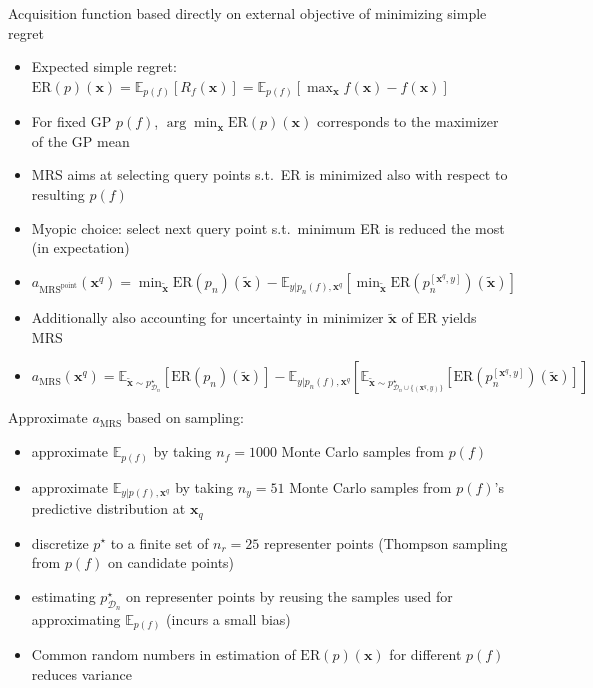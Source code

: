 \begin{block}{}

Acquisition function based directly on external objective of minimizing simple regret
\begin{itemize}
 \item Expected simple regret: $\text{ER}(p)(\mathbf{x}) = \mathbb{E}_{p(f)}[R_f(\mathbf{x})]
= \mathbb{E}_{p(f)}[\max_{\mathbf{x}} f(\mathbf{x}) - f(\mathbf{
x})]$
 \item For fixed GP $p(f)$, $\arg\min_\mathbf{x} \text{ER}(p)(\mathbf{x})$ corresponds to the maximizer of the GP mean
 \item MRS aims at selecting query points s.t.\  ER is minimized also with respect to resulting $p(f)$
 \item Myopic choice: select next query point s.t.\ minimum ER is reduced the most (in expectation)
 \item $a_{\text{MRS}^{\text{point}}}(\mathbf{x}^q)
	= \min_{\mathbf{\tilde x}}\text{ER}(p_n)(\mathbf{\tilde x})
	 - \mathbb{E}_{y \vert p_n(f), \mathbf{x}^q}[\min_{\mathbf{\tilde x}}  \text{ER}(p^{[\mathbf{x}^q, y]}_n)(\mathbf{\tilde x})]$
 \item Additionally also accounting for uncertainty in minimizer $\mathbf{\tilde x}$ of $\text{ER}$ yields MRS
 \item $a_{\text{MRS}}(\mathbf{x}^q)
    = \mathbb{E}_{\mathbf{\tilde x} \sim p^\star_{\mathcal{D}_n}}[\text{ER}(p_n)(\mathbf{\tilde x})] 
	   - \mathbb{E}_{y \vert p_n(f), \mathbf{x}^q}[
		  \mathbb{E}_{\mathbf{\tilde x} \sim p^\star_{\mathcal{D}_n \cup \{(\mathbf{x}^q, y)\}}}[
			 \text{ER}(p^{[\mathbf{x}^q, y]}_n)(\mathbf{\tilde x})]]$
\end{itemize}

Approximate $a_{\text{MRS}}$ based on sampling:
\begin{itemize}
 \item approximate $\mathbb{E}_{p(f)}$ by taking $n_f=1000$ Monte Carlo samples from $p(f)$
 \item approximate $\mathbb{E}_{y \vert p(f), \mathbf{x}^q}$  by taking
$n_y=51$ Monte Carlo samples from $p(f)$'s predictive distribution at
$\mathbf{x}_q$
 \item discretize $p^\star$ to a finite set of $n_r=25$ representer points (Thompson
sampling from $p(f)$ on candidate points)
 \item estimating $p^\star_{\mathcal{D}_n}$ on representer points by reusing the samples used 
for approximating $\mathbb{E}_{p(f)}$ (incurs a small bias)
\item Common random numbers in estimation of
$\text{ER}(p)(\mathbf{x})$ for different $p(f)$ reduces variance
\end{itemize}
\end{block}

